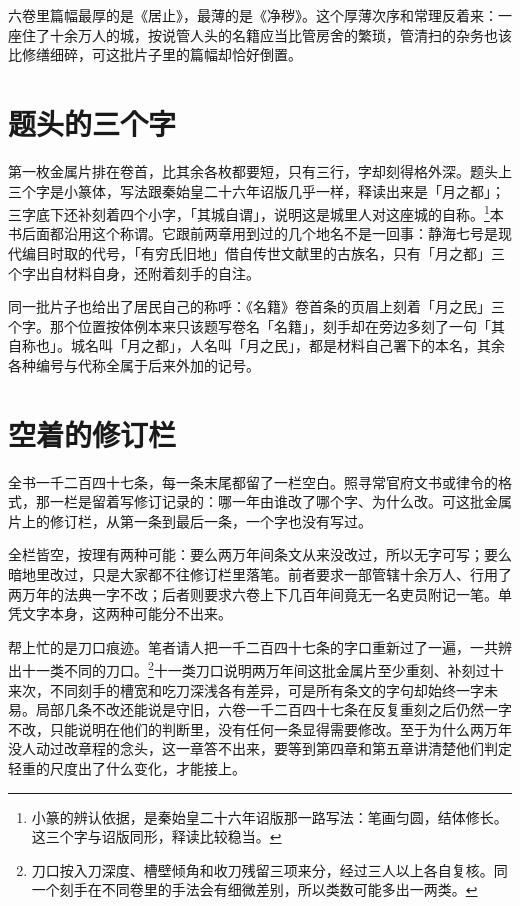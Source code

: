 六卷里篇幅最厚的是《居止》，最薄的是《净秽》。这个厚薄次序和常理反着来：一座住了十余万人的城，按说管人头的名籍应当比管房舍的繁琐，管清扫的杂务也该比修缮细碎，可这批片子里的篇幅却恰好倒置。

\section{题头的三个字}

第一枚金属片排在卷首，比其余各枚都要短，只有三行，字却刻得格外深。题头上三个字是小篆体，写法跟秦始皇二十六年诏版几乎一样，释读出来是「月之都」；三字底下还补刻着四个小字，「其城自谓」，说明这是城里人对这座城的自称。\footnote{小篆的辨认依据，是秦始皇二十六年诏版那一路写法：笔画匀圆，结体修长。这三个字与诏版同形，释读比较稳当。}本书后面都沿用这个称谓。它跟前两章用到过的几个地名不是一回事：静海七号是现代编目时取的代号，「有穷氏旧地」借自传世文献里的古族名，只有「月之都」三个字出自材料自身，还附着刻手的自注。

同一批片子也给出了居民自己的称呼：《名籍》卷首条的页眉上刻着「月之民」三个字。那个位置按体例本来只该题写卷名「名籍」，刻手却在旁边多刻了一句「其自称也」。城名叫「月之都」，人名叫「月之民」，都是材料自己署下的本名，其余各种编号与代称全属于后来外加的记号。

\section{空着的修订栏}

全书一千二百四十七条，每一条末尾都留了一栏空白。照寻常官府文书或律令的格式，那一栏是留着写修订记录的：哪一年由谁改了哪个字、为什么改。可这批金属片上的修订栏，从第一条到最后一条，一个字也没有写过。

全栏皆空，按理有两种可能：要么两万年间条文从来没改过，所以无字可写；要么暗地里改过，只是大家都不往修订栏里落笔。前者要求一部管辖十余万人、行用了两万年的法典一字不改；后者则要求六卷上下几百年间竟无一名吏员附记一笔。单凭文字本身，这两种可能分不出来。

帮上忙的是刀口痕迹。笔者请人把一千二百四十七条的字口重新过了一遍，一共辨出十一类不同的刀口。\footnote{刀口按入刀深度、槽壁倾角和收刀残留三项来分，经过三人以上各自复核。同一个刻手在不同卷里的手法会有细微差别，所以类数可能多出一两类。}十一类刀口说明两万年间这批金属片至少重刻、补刻过十来次，不同刻手的槽宽和吃刀深浅各有差异，可是所有条文的字句却始终一字未易。局部几条不改还能说是守旧，六卷一千二百四十七条在反复重刻之后仍然一字不改，只能说明在他们的判断里，没有任何一条显得需要修改。至于为什么两万年没人动过改章程的念头，这一章答不出来，要等到第四章和第五章讲清楚他们判定轻重的尺度出了什么变化，才能接上。

